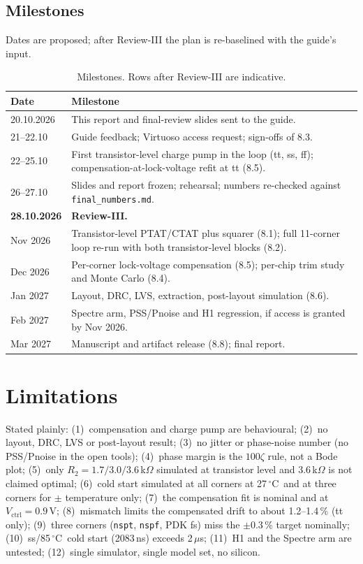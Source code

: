 \documentclass[11pt,a4paper]{article}
\newcommand{\vc}{V_{\mathrm{ctrl}}}
\newcommand{\degC}{\,$^\circ$C}
\begin{document}
\subsection{Milestones}
Dates are proposed; after Review-III the plan is re-baselined with the guide's input.
\begin{table}[!htbp]\centering\small
\begin{tabular}{p{3.2cm}p{9.3cm}}\toprule
Date & Milestone\\\midrule
20.10.2026 & This report and final-review slides sent to the guide.\\
21--22.10 & Guide feedback; Virtuoso access request; sign-offs of 8.3.\\
22--25.10 & First transistor-level charge pump in the loop (tt, ss, ff); compensation-at-lock-voltage refit at tt (8.5).\\
26--27.10 & Slides and report frozen; rehearsal; numbers re-checked against \texttt{final\_numbers.md}.\\
\textbf{28.10.2026} & \textbf{Review-III.}\\\midrule
Nov 2026 & Transistor-level PTAT/CTAT plus squarer (8.1); full 11-corner loop re-run with both transistor-level blocks (8.2).\\
Dec 2026 & Per-corner lock-voltage compensation (8.5); per-chip trim study and Monte Carlo (8.4).\\
Jan 2027 & Layout, DRC, LVS, extraction, post-layout simulation (8.6).\\
Feb 2027 & Spectre arm, PSS/Pnoise and H1 regression, if access is granted by Nov 2026.\\
Mar 2027 & Manuscript and artifact release (8.8); final report.\\\bottomrule
\end{tabular}
\caption{Milestones. Rows after Review-III are indicative.}
\end{table}

\section{Limitations}
Stated plainly: (1)~compensation and charge pump are behavioural; (2)~no layout, DRC, LVS or post-layout result; (3)~no jitter or phase-noise number (no PSS/Pnoise in the open tools); (4)~phase margin is the $100\zeta$ rule, not a Bode plot; (5)~only $R_2=1.7/3.0/3.6$\,k$\Omega$ simulated at transistor level and 3.6\,k$\Omega$ is not claimed optimal; (6)~cold start simulated at all corners at 27\degC\ and at three corners for $\pm$ temperature only; (7)~the compensation fit is nominal and at $\vc=0.9$\,V; (8)~mismatch limits the compensated drift to about 1.2--1.4\,\% (tt only); (9)~three corners (\texttt{nspt}, \texttt{nspf}, PDK fs) miss the $\pm0.3\,\%$ target nominally; (10)~ss/85\degC\ cold start (2083\,ns) exceeds 2\,$\mu$s; (11)~H1 and the Spectre arm are untested; (12)~single simulator, single model set, no silicon.
\end{document}

